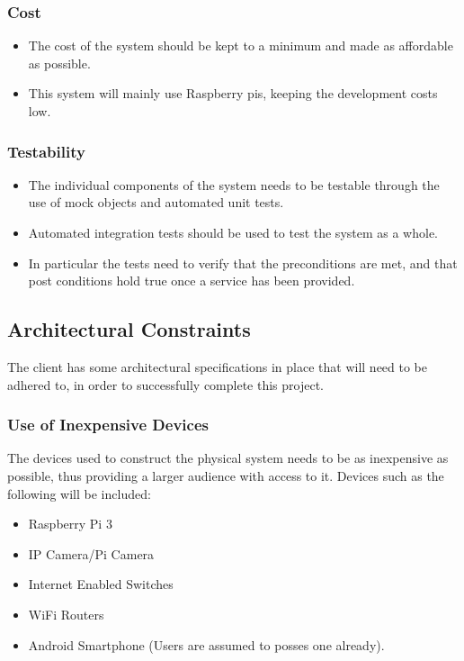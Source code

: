 \documentclass[a4paper,12pt]{article}
\begin{document}
	\subsubsection{Cost}
	\begin{itemize}
		\item The cost of the system should be kept to a minimum and made as affordable as possible. 
		\item This system will mainly use Raspberry pis, keeping the development costs low. 
	\end{itemize}
	
	
	\subsubsection{Testability}
	\begin{itemize}
		\item The individual components of the system needs to be testable through the use of mock objects and automated unit tests.
		\item Automated integration tests should be used to test the system as a whole.
		\item In particular the tests need to verify that the preconditions are met, and that post conditions hold true once a service has been provided.
	\end{itemize}
	
	\subsection{Architectural Constraints}
	The client has some architectural specifications in place that will need to be adhered to, in order to successfully complete this project.
	
	\subsubsection{Use of Inexpensive Devices}
	The devices used to construct the physical system needs to be as inexpensive as possible, thus providing a larger audience with access to it. Devices such as the following will be included:
	\begin{itemize}
		\item Raspberry Pi 3
		\item IP Camera/Pi Camera
		\item Internet Enabled Switches
		\item WiFi Routers
		\item Android Smartphone (Users are assumed to posses one already).
	\end{itemize}
	
\end{document}
